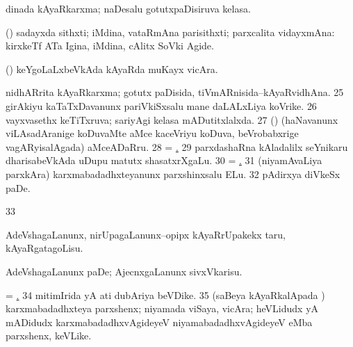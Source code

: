 { dinada kAyaRkarxma; naDesalu gotutxpaDisiruva kelasa.

 (\rUpa) sadayxda sithxti; iMdina, vataRmAna parisithxti;
parxcalita vidayxmAna:  kirxkeTf
ATa Igina, iMdina, cAlitx SoVki Agide.

 (\rUpa) keYgoLaLxbeVkAda kAyaRda muKayx vicAra.

 nidhARrita kAyaRkarxma; gotutx paDisida, tiVmARnisida--kAyaRvidhAna.
\num{25}  girAkiyu kaTaTxDavanunx pariVkiSxsalu mane daLALxLiya koVrike.
\hypertarget{order1pagu26}{}
\num{26}  vayxvasethx keTiTxruva; sariyAgi kelasa mADutitxlalxda.
\hypertarget{order1pagu27}{}
\num{27}  (\birx) (haNavanunx viLAsadAranige
koDuvaMte aMce kaceVriyu koDuva, beVrobabxrige vagARyisalAgada) aMceADaRru. 
\num{28}  = \hyperlink{order1pagu27}{\pagu {}.}
\num{29}  parxdashaRna kAladalilx seYnikaru dharisabeVkAda uDupu matutx shasatxrXgaLu.
\num{30}  = \hyperlink{order1pagu31}{\pagu {}.}
\hypertarget{order1pagu31}{}
\num{31}  (niyamAvaLiya parxkAra) karxmabadadhxteyanunx parxshinxsalu ELu.
\hypertarget{order1pagu32}{}
\num{32}  pAdirxya diVkeSx paDe.
\num{33}  

 AdeVshagaLanunx, nirUpagaLanunx--opipx kAyaRrUpakekx taru, kAyaRgatagoLisu.

 AdeVshagaLanunx paDe; AjecnxgaLanunx 
sivxVkarisu.

 = \hyperlink{order1pagu32}{\pagu {}.}
\num{34}  mitimIrida yA ati dubAriya beVDike.
\num{35}  (saBeya kAyaRkalApada \vi)
karxmabadadhxteya parxshenx; niyamada viSaya, vicAra; heVLidudx yA
mADidudx karxmabadadhxvAgideyeV niyamabadadhxvAgideyeV eMba parxshenx,
keVLike.} 
\eentry

\bentry
{}
\gl{\sakirx}
{}

